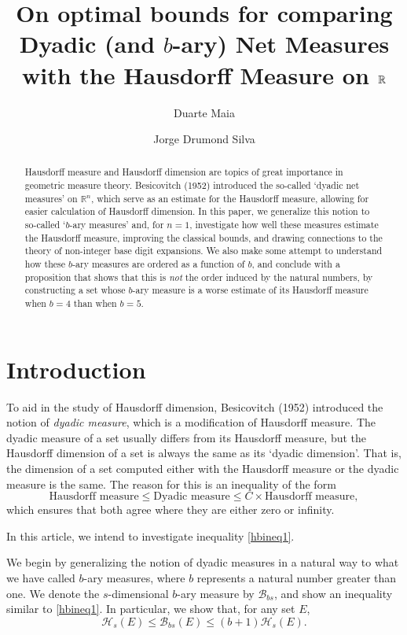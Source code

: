 \documentclass[11pt, reqno]{amsart}
\title[\textbf{Optimal bounds for $b$-ary measures}]{\textbf{On optimal bounds for comparing Dyadic (and $b$-ary) Net Measures with the Hausdorff Measure on $\R$}}
\author{Duarte Maia}
\author{Jorge Drumond Silva}
\date{}
\newcommand{\R}{\mathbb{R}}
\newcommand{\HH}{\mathcal{H}}
\newcommand{\BB}{\mathcal{B}}
\begin{document}
\begin{abstract}
Hausdorff measure and Hausdorff dimension are topics of great importance in geometric measure theory. Besicovitch (1952) introduced the so-called `dyadic net measures' on $\R^n$, which serve as an estimate for the Hausdorff measure, allowing for easier calculation of Hausdorff dimension. In this paper, we generalize this notion to so-called `$b$-ary measures' and, for $n = 1$, investigate how well these measures estimate the Hausdorff measure, improving the classical bounds, and drawing connections to the theory of non-integer base digit expansions. We also make some attempt to understand how these $b$-ary measures are ordered as a function of $b$, and conclude with a proposition that shows that this is \emph{not} the order induced by the natural numbers, by constructing a set whose $b$-ary measure is a worse estimate of its Hausdorff measure when $b = 4$ than when $b = 5$.
\end{abstract}

\maketitle

\section{Introduction}

To aid in the study of Hausdorff dimension, Besicovitch (1952) introduced the notion of \emph{dyadic measure}, which is a modification of Hausdorff measure. The dyadic measure of a set usually differs from its Hausdorff measure, but the Hausdorff dimension of a set is always the same as its `dyadic dimension'. That is, the dimension of a set computed either with the Hausdorff measure or the dyadic measure is the same. The reason for this is an inequality of the form
\begin{equation}\label{hbineq1}
\text{Hausdorff measure} \leq \text{Dyadic measure} \leq C \times \text{Hausdorff measure},
\end{equation}
which ensures that both agree where they are either zero or infinity.

In this article, we intend to investigate inequality \eqref{hbineq1}.

We begin by generalizing the notion of dyadic measures in a natural way to what we have called $b$-ary measures, where $b$ represents a natural number greater than one. We denote the $s$-dimensional $b$-ary measure by $\BB_{bs}$, and show an inequality similar to \eqref{hbineq1}. In particular, we show that, for any set $E$,
\begin{equation}\label{hbineq2}
\HH_s(E) \leq \BB_{bs}(E) \leq (b+1) \HH_s(E).
\end{equation}
\end{document}
